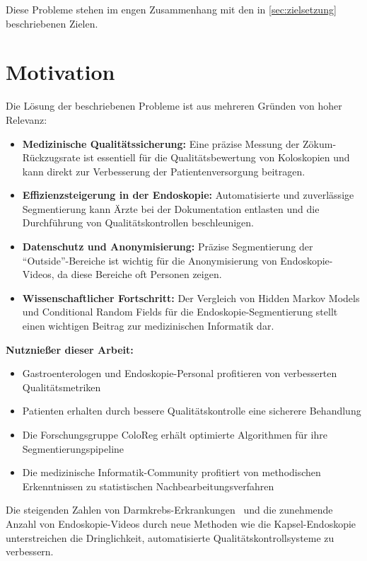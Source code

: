 Diese Probleme stehen im engen Zusammenhang mit den in \cref{sec:zielsetzung} beschriebenen Zielen.

\section{Motivation}

Die Lösung der beschriebenen Probleme ist aus mehreren Gründen von hoher Relevanz:

\begin{itemize}
\item \textbf{Medizinische Qualitätssicherung:} Eine präzise Messung der Zökum-Rückzugsrate ist essentiell für die Qualitätsbewertung von Koloskopien und kann direkt zur Verbesserung der Patientenversorgung beitragen.

\item \textbf{Effizienzsteigerung in der Endoskopie:} Automatisierte und zuverlässige Segmentierung kann Ärzte bei der Dokumentation entlasten und die Durchführung von Qualitätskontrollen beschleunigen.

\item \textbf{Datenschutz und Anonymisierung:} Präzise Segmentierung der \enquote{Outside}-Bereiche ist wichtig für die Anonymisierung von Endoskopie-Videos, da diese Bereiche oft Personen zeigen.

\item \textbf{Wissenschaftlicher Fortschritt:} Der Vergleich von Hidden Markov Models und Conditional Random Fields für die Endoskopie-Segmentierung stellt einen wichtigen Beitrag zur medizinischen Informatik dar.
\end{itemize}

\textbf{Nutznießer dieser Arbeit:}
\begin{itemize}
\item Gastroenterologen und Endoskopie-Personal profitieren von verbesserten Qualitätsmetriken
\item Patienten erhalten durch bessere Qualitätskontrolle eine sicherere Behandlung  
\item Die Forschungsgruppe ColoReg erhält optimierte Algorithmen für ihre Segmentierungspipeline
\item Die medizinische Informatik-Community profitiert von methodischen Erkenntnissen zu statistischen Nachbearbeitungsverfahren
\end{itemize}

Die steigenden Zahlen von Darmkrebs-Erkrankungen~\citep{acs-2024,ferlay-2024} und die zunehmende Anzahl von Endoskopie-Videos durch neue Methoden wie die Kapsel-Endoskopie~\citep{koulaouzidis-2021} unterstreichen die Dringlichkeit, automatisierte Qualitätskontrollsysteme zu verbessern.

